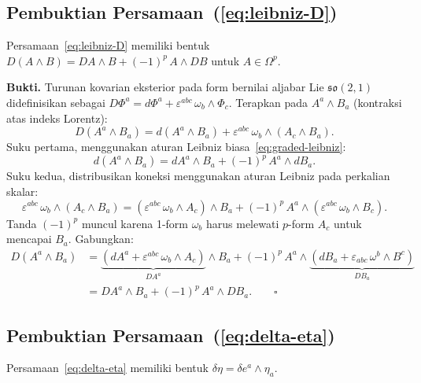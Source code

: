  
\subsection{Pembuktian Persamaan~(\ref{eq:leibniz-D})}
\label{app:proof-leibniz-D}
 
Persamaan~\eqref{eq:leibniz-D} memiliki bentuk $D(A \wedge B) = DA \wedge B + (-1)^p\,A \wedge DB$ untuk $A \in \Omega^p$.
 
\bigskip\noindent\textbf{Bukti.} Turunan kovarian eksterior pada form bernilai aljabar Lie $\mathfrak{so}(2,1)$ didefinisikan sebagai $D\Phi^a = d\Phi^a + \varepsilon^{abc}\,\omega_b \wedge \Phi_c$. Terapkan pada $A^a \wedge B_a$ (kontraksi atas indeks Lorentz):
\begin{equation}
    D(A^a \wedge B_a) = d(A^a \wedge B_a) + \varepsilon^{abc}\,\omega_b \wedge (A_c \wedge B_a).
\end{equation}
Suku pertama, menggunakan aturan Leibniz biasa~\eqref{eq:graded-leibniz}:
\begin{equation}
    d(A^a \wedge B_a) = dA^a \wedge B_a + (-1)^p\,A^a \wedge dB_a.
\end{equation}
Suku kedua, distribusikan koneksi menggunakan aturan Leibniz pada perkalian skalar:
\begin{equation}
    \varepsilon^{abc}\,\omega_b \wedge (A_c \wedge B_a) = (\varepsilon^{abc}\,\omega_b \wedge A_c) \wedge B_a + (-1)^p\,A^a \wedge (\varepsilon^{abc}\,\omega_b \wedge B_c).
\end{equation}
Tanda $(-1)^p$ muncul karena 1-form $\omega_b$ harus melewati $p$-form $A_c$ untuk mencapai $B_a$. Gabungkan:
\begin{align}
    D(A^a \wedge B_a)
    &= \underbrace{(dA^a + \varepsilon^{abc}\,\omega_b \wedge A_c)}_{DA^a} \wedge B_a + (-1)^p\,A^a \wedge \underbrace{(dB_a + \varepsilon_{abc}\,\omega^b \wedge B^c)}_{DB_a} \nonumber\\
    &= DA^a \wedge B_a + (-1)^p\,A^a \wedge DB_a. \qquad\square
\end{align}
 
 
\subsection{Pembuktian Persamaan~(\ref{eq:delta-eta})}
\label{app:proof-delta-eta}
 
Persamaan~\eqref{eq:delta-eta} memiliki bentuk $\delta\eta = \delta e^a \wedge \eta_a$.
 
